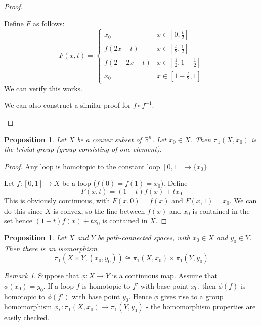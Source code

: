 \documentclass{article}
\theoremstyle{definition}
\theoremstyle{plain}%
\newtheorem{prop}[thm]{Proposition}
\theoremstyle{remark}
\newtheorem*{rem}{Remark}
\newcommand{\R}{\mathbb{R}}
\begin{document}
\begin{proof}
\begin{enumerate}
         Define $F$ as follows:
         \[F(x,t) = \begin{cases} 
            x_0 &x \in [0, \frac{t}{2}] \\
            f(2x - t) &x \in [\frac{t}{2}, \frac{1}{2}] \\
            f(2 - 2x - t) &x \in [\frac{1}{2}, 1 - \frac{1}{2}] \\
            x_0 &x \in [1-\frac{t}{2}, 1]
         \end{cases}\]
         We can verify this works.
         
         We can also construct a similar proof for $f \circ f^{-1}$.
     \end{enumerate}
\end{proof}

\begin{prop}
    Let $X$ be a convex subset of $\R^n$. Let $x_0 \in X$. Then $\pi_1(X,x_0)$ is the trivial group (group consisting of one element).
\end{prop}

\begin{proof}
     Any loop is homotopic to the constant loop $[0,1] \to \{x_0\}$.
     
     Let $f: [0,1] \to X$ be a loop ($f(0) = f(1) = x_0$). Define
     \[F(x,t) = (1-t)f(x) + tx_0\]
     This is obviously continuous, with $F(x,0) = f(x)$ and $F(x,1) = x_0$. We can do this since $X$ is convex, so the line between $f(x)$ and $x_0$ is contained in the set hence $(1-t)f(x) + tx_0$ is contained in $X$.
\end{proof}

\begin{prop}
    Let $X$ and $Y$ be path-connected spaces, with $x_0 \in X$ and $y_0 \in Y$. Then there is an isomorphism 
    \[\pi_1(X \times Y, (x_0,y_0)) \cong \pi_1(X, x_0) \times \pi_1(Y, y_0)\]
\end{prop}

\begin{rem}
    Suppose that $\phi: X \to Y$ is a continuous map. Assume that $\phi (x_0) = y_0$. If a loop $f$ is homotopic to $f'$ with base point $x_0$, then $\phi(f)$ is homotopic to $\phi(f')$ with base point $y_0$. Hence $\phi$ gives rise to a group homomorphism $\phi_* : \pi_1(X, x_0) \to \pi_1(Y, y_0)$ - the homomorphism properties are easily checked.
\end{rem}
\end{document}
